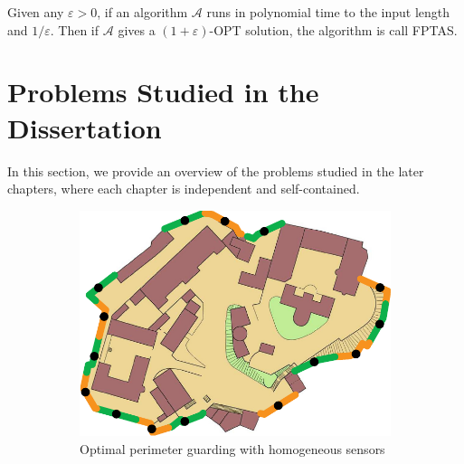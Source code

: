 \begin{definition}
    Given any $\varepsilon>0$, if an algorithm $\mathcal A$ runs in polynomial time to the input length and $1/\varepsilon$. 
    Then if $\mathcal A$ gives a $(1+\varepsilon)$-OPT solution, the algorithm is call FPTAS.
\end{definition}
\section{Problems Studied in the Dissertation}
In this section, we provide an overview of the problems studied in the later chapters, 
where each chapter is independent and self-contained. 

\begin{figure}[h]
    \centering
    \begin{subfigure}[b]{0.4\textwidth}
        \centering
        \includegraphics[width = \textwidth]{chapters/opg/figures/castle_15-eps-converted-to.pdf}
        \caption{Optimal perimeter guarding with homogeneous sensors}
        \label{fig:intro-opg-ho}
    \end{subfigure}
    \begin{subfigure}[b]{0.4\textwidth}
        \centering

\end{subfigure}
\end{figure}
